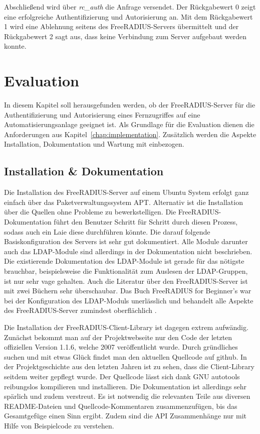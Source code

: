 \documentclass[11pt,a4paper]{report}
\begin{document}
Abschließend wird über \textit{rc\_auth} die Anfrage versendet. Der Rückgabewert 0 zeigt eine erfolgreiche Authentifizierung und Autorisierung an. Mit dem Rückgabewert 1 wird eine Ablehnung seitens des FreeRADIUS-Servers übermittelt und der Rückgabewert 2 sagt aus, dass keine Verbindung zum Server aufgebaut werden konnte.

\chapter{Evaluation} \label{chap:evaluation}

In diesem Kapitel soll herausgefunden werden, ob der FreeRADIUS-Server für die Authentifizierung und Autorisierung eines Fernzugriffes auf eine Automatisierungsanlage geeignet ist. Als Grundlage für die Evaluation dienen die Anforderungen aus Kapitel~\ref{chap:implementation}. Zusätzlich werden die Aspekte Installation, Dokumentation und Wartung mit einbezogen.

\section{Installation \& Dokumentation}

Die Installation des FreeRADIUS-Server auf einem Ubuntu System erfolgt ganz einfach über das Paketverwaltungssystem APT. Alternativ ist die Installation über die Quellen ohne Probleme zu bewerkstelligen. Die FreeRADIUS-Dokumentation führt den Benutzer Schritt für Schritt durch diesen Prozess, sodass auch ein Laie diese durchführen könnte. Die darauf folgende Basiskonfiguration des Servers ist sehr gut dokumentiert. Alle Module darunter auch das LDAP-Module sind allerdings in der Dokumentation nicht beschrieben. Die existierende Dokumentation des LDAP-Module ist gerade für das nötigste brauchbar, beispielsweise die Funktionalität zum Auslesen der LDAP-Gruppen, ist nur sehr vage gehalten. Auch die Literatur über den FreeRADIUS-Server ist mit zwei Büchern sehr überschaubar. Das Buch FreeRADIUS for Beginner's war bei der Konfiguration des LDAP-Moduls unerlässlich und behandelt alle Aspekte des FreeRADIUS-Server zumindest oberflächlich \cite{walt}. 

Die Installation der FreeRADIUS-Client-Library ist dagegen extrem aufwändig. Zunächst bekommt man auf der Projektwebseite nur den Code der letzten offiziellen Version 1.1.6, welche 2007 veröffentlicht wurde. Durch gründliches suchen und mit etwas Glück findet man den aktuellen Quellcode auf github. In der Projektgeschichte aus den letzten Jahren ist zu sehen, dass die Client-Library seitdem weiter gepflegt wurde. Der Quellcode lässt sich dank GNU autotools reibungslos kompilieren und installieren. Die Dokumentation ist allerdings sehr spärlich und zudem verstreut. Es ist notwendig die relevanten Teile aus diversen README-Dateien und Quellcode-Kommentaren zusammenzufügen, bis das Gesamtgefüge einen Sinn ergibt. Zudem sind die API Zusammenhänge nur mit Hilfe von Beispielcode zu verstehen.
\end{document}
